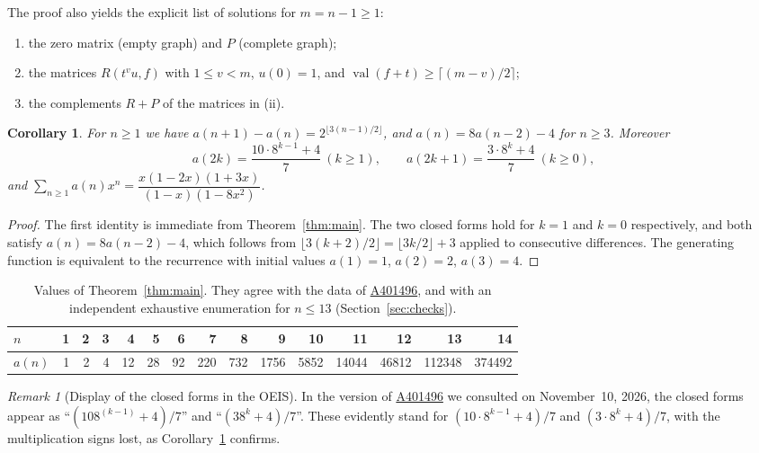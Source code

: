 \documentclass[11pt,a4paper]{amsart}
\newtheorem{corollary}[theorem]{Corollary}
\theoremstyle{definition}
\theoremstyle{remark}
\newtheorem{remark}[theorem]{Remark}
\newcommand{\val}{\operatorname{val}}
\newcommand{\oeis}[1]{\href{https://oeis.org/#1}{#1}}
\begin{document}
The proof also yields the explicit list of solutions for $m=n-1\ge1$:
\begin{enumerate}[label=\textup{(\roman*)},leftmargin=2.2em]
\item the zero matrix (empty graph) and $P$ (complete graph);
\item the matrices $R(t^vu,f)$ with $1\le v<m$, $u(0)=1$, and $\val(f+t)\ge\lceil (m-v)/2\rceil$;
\item the complements $R+P$ of the matrices in (ii).
\end{enumerate}

\begin{corollary}\label{cor:closed}
For $n\ge1$ we have $a(n+1)-a(n)=2^{\lfloor 3(n-1)/2\rfloor}$, and $a(n)=8a(n-2)-4$ for $n\ge3$. Moreover
\[
  a(2k)=\frac{10\cdot 8^{k-1}+4}{7}\ (k\ge1),\qquad
  a(2k+1)=\frac{3\cdot 8^{k}+4}{7}\ (k\ge0),
\]
and $\sum_{n\ge1}a(n)x^n = \dfrac{x(1-2x)(1+3x)}{(1-x)(1-8x^2)}$.
\end{corollary}

\begin{proof}
The first identity is immediate from Theorem~\ref{thm:main}. The two closed forms hold for $k=1$ and $k=0$ respectively, and both satisfy $a(n)=8a(n-2)-4$, which follows from $\lfloor 3(k+2)/2\rfloor=\lfloor 3k/2\rfloor+3$ applied to consecutive differences. The generating function is equivalent to the recurrence with initial values $a(1)=1$, $a(2)=2$, $a(3)=4$.
\end{proof}

\begin{table}[ht]
\centering
\begin{tabular}{@{}lrrrrrrrrrrrrrr@{}}
\toprule
$n$ & 1&2&3&4&5&6&7&8&9&10&11&12&13&14\\
\midrule
$a(n)$ &1&2&4&12&28&92&220&732&1756&5852&14044&46812&112348&374492\\
\bottomrule
\end{tabular}
\caption{Values of Theorem~\ref{thm:main}. They agree with the data of \oeis{A401496}, and with an independent exhaustive enumeration for $n\le 13$ (Section~\ref{sec:checks}).}
\label{tab:values}
\end{table}

\begin{remark}[Display of the closed forms in the OEIS]
In the version of \oeis{A401496} we consulted on November~10, 2026, the closed forms appear as ``$(108^{(k-1)}+4)/7$'' and ``$(38^k+4)/7$''. These evidently stand for $(10\cdot 8^{k-1}+4)/7$ and $(3\cdot 8^{k}+4)/7$, with the multiplication signs lost, as Corollary~\ref{cor:closed} confirms.
\end{remark}
\end{document}
